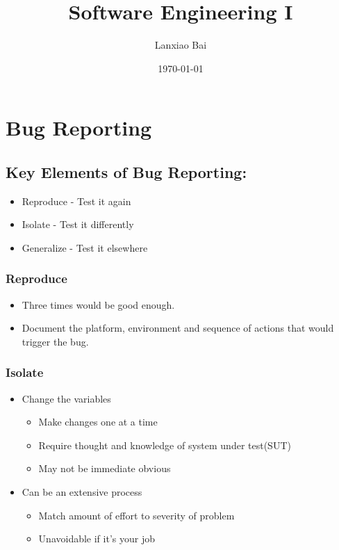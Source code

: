 \documentclass[12pt]{article}
\title{Software Engineering I}
\date{\today}
\author{Lanxiao Bai}
\begin{document}
\maketitle
\newpage
\tableofcontents
\newpage

\section{Bug Reporting}
\subsection{Key Elements of Bug Reporting:}
\begin{itemize}
    \item Reproduce - Test it again
    \item Isolate - Test it differently
    \item Generalize - Test it elsewhere
\end{itemize}
\subsubsection{Reproduce}
    \begin{itemize}
        \item Three times would be good enough.
        \item Document the platform, environment and sequence of actions that would trigger the bug.
    \end{itemize}

\subsubsection{Isolate}
    \begin{itemize}
        \item Change the variables
            \begin{itemize}
                \item Make changes one at a time
                \item Require thought and knowledge of system under test(SUT)
                \item May not be immediate obvious
            \end{itemize}
        \item Can be an extensive process
            \begin{itemize}
                \item Match amount of effort to severity of problem
                \item Unavoidable if it's your job
            \end{itemize}
    \end{itemize}
\end{document}
